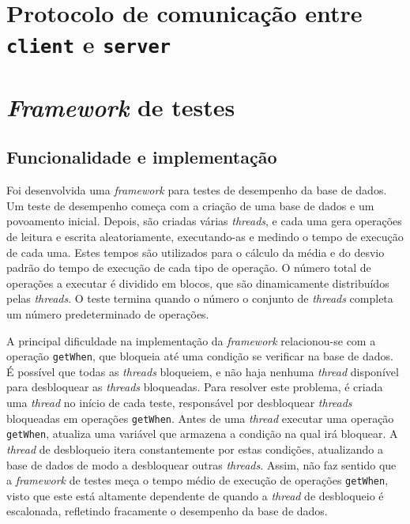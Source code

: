 \documentclass[11pt, a4paper]{article}
\begin{document}
\section{Protocolo de comunicação entre \texttt{client} e \texttt{server}}

\pagebreak %
\section{\emph{Framework} de testes}

\subsection{Funcionalidade e implementação}

Foi desenvolvida uma \emph{framework} para testes de desempenho da base de dados. Um teste de
desempenho começa com a criação de uma base de dados e um povoamento inicial. Depois, são criadas
várias \emph{threads}, e cada uma gera operações de leitura e escrita aleatoriamente, executando-as
e medindo o tempo de execução de cada uma. Estes tempos são utilizados para o cálculo da média e do
desvio padrão do tempo de execução de cada tipo de operação. O número total de operações a executar
é dividido em blocos, que são dinamicamente distribuídos pelas \emph{threads}. O teste termina
quando o número o conjunto de \emph{threads} completa um número predeterminado de operações.

A principal dificuldade na implementação da \emph{framework} relacionou-se com a operação
\texttt{getWhen}, que bloqueia até uma condição se verificar na base de dados. É possível que todas
as \emph{threads} bloqueiem, e não haja nenhuma \emph{thread} disponível para desbloquear as
\emph{threads} bloqueadas. Para resolver este problema, é criada uma \emph{thread} no início de cada
teste, responsável por desbloquear \emph{threads} bloqueadas em operações \texttt{getWhen}. Antes de
uma \emph{thread} executar uma operação \texttt{getWhen}, atualiza uma variável que armazena a
condição na qual irá bloquear. A \emph{thread} de desbloqueio itera constantemente por estas
condições, atualizando a base de dados de modo a desbloquear outras \emph{threads}. Assim, não faz
sentido que a \emph{framework} de testes meça o tempo médio de execução de operações
\texttt{getWhen}, visto que este está altamente dependente de quando a \emph{thread} de desbloqueio
é escalonada, refletindo fracamente o desempenho da base de dados.
\end{document}
